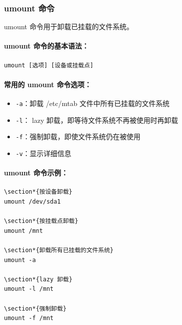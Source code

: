 \documentclass[12pt,UTF8]{ctexbook}
\begin{document}
\subsubsection{umount 命令}
umount 命令用于卸载已挂载的文件系统。

\paragraph{umount 命令的基本语法：}
\begin{verbatim}
umount [选项] [设备或挂载点]
\end{verbatim}

\paragraph{常用的 umount 命令选项：}
\begin{itemize}
    \item \verb+-a+：卸载 /etc/mtab 文件中所有已挂载的文件系统
    \item \verb+-l+： lazy 卸载，即等待文件系统不再被使用时再卸载
    \item \verb+-f+：强制卸载，即使文件系统仍在被使用
    \item \verb+-v+：显示详细信息
\end{itemize}

\paragraph{umount 命令示例：}
\begin{verbatim}
\section*{按设备卸载}
umount /dev/sda1

\section*{按挂载点卸载}
umount /mnt

\section*{卸载所有已挂载的文件系统}
umount -a

\section*{lazy 卸载}
umount -l /mnt

\section*{强制卸载}
umount -f /mnt
\end{verbatim}
\end{document}
